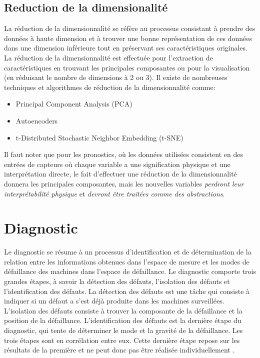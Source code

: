 \subsection{Reduction de la dimensionalité}
\label{section:dimensionality-reduction}
La réduction de la dimensionnalité se réfère au processus consistant à prendre des données à haute dimension et à trouver une bonne représentation de ces données dans une dimension inférieure tout en préservant ses caractéristiques originales. La réduction de la dimensionnalité est effectuée pour l'extraction de caractéristiques en trouvant les principales composantes ou pour la visualisation (en réduisant le nombre de dimensions à 2 ou 3).
Il existe de nombreuses techniques et algorithmes de réduction de la dimensionnalité comme:
\begin{itemize}
    \item Principal Component Analysis (PCA)
    \item Autoencoders
    \item t-Distributed Stochastic Neighbor Embedding (t-SNE)
\end{itemize}

Il faut noter que pour les pronostics, où les données utilisées consistent en des entrées de capteurs où chaque variable a une signification physique et une interprétation directe, le fait d'effectuer une réduction de la dimensionnalité donnera les principales composantes, mais les nouvelles variables \textit{perdront leur interprétabilité physique} et \textit{devront être traitées comme des abstractions}.


\section{Diagnostic}
Le diagnostic se résume à un processus d'identification et de détermination de la relation entre les informations obtenues dans l'espace de mesure et les modes de défaillance des machines dans l'espace de défaillance. Le diagnostic comporte trois grandes étapes, à savoir la détection des défauts, l'isolation des défauts et l'identification des défauts. La détection des défauts est une tâche qui consiste à indiquer si un défaut a s'est déjà produite dans les machines surveillées. L'isolation des défauts consiste à trouver la composante de la défaillance et la position de la défaillance. L'identification des défauts est la dernière étape du diagnostic, qui tente de déterminer le mode et la gravité de la défaillance. Les trois étapes sont en corrélation entre eux. Cette dernière étape repose sur les résultats de la première et ne peut donc pas être réalisée individuellement \cite{Lei2016b}.


